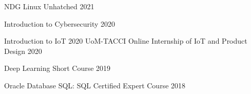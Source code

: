 

\begin{cvhonors}

  \cvhonor
    {} %
    {NDG Linux Unhatched} %
    {} %
    {2021} %

  \cvhonor
    {} %
    {Introduction to Cybersecurity} %
    {} %
    {2020} %

  \cvhonor
    {} %
    {Introduction to IoT} %
    {} %
    {2020} %
  \cvhonor
    {} %
    {UoM-TACCI Online Internship of IoT and Product Design} %
    {} %
    {2020} %

  \cvhonor
    {} %
    {Deep Learning Short Course} %
    {} %
    {2019} %

  \cvhonor
    {} %
    {Oracle Database SQL: SQL Certified Expert Course} %
    {} %
    {2018} %

\end{cvhonors}